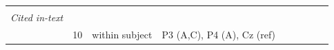 \documentclass[11pt,english,]{memoir}
\begin{document}
\begin{longtable}[]{@{}lllllllll@{}}
\begin{minipage}[t]{0.04\columnwidth}
\strut
\end{minipage} & \begin{minipage}[t]{0.04\columnwidth}\raggedright
\strut
\end{minipage} & \begin{minipage}[t]{0.10\columnwidth}\raggedright
\strut
\end{minipage} & \begin{minipage}[t]{0.28\columnwidth}\raggedright
\strut
\end{minipage}\tabularnewline
\begin{minipage}[t]{0.09\columnwidth}\raggedright
\emph{Cited in-text}\strut
\end{minipage} & \begin{minipage}[t]{0.02\columnwidth}\raggedright
\strut
\end{minipage} & \begin{minipage}[t]{0.04\columnwidth}\raggedright
\strut
\end{minipage} & \begin{minipage}[t]{0.10\columnwidth}\raggedright
\strut
\end{minipage} & \begin{minipage}[t]{0.04\columnwidth}\raggedright
\strut
\end{minipage} & \begin{minipage}[t]{0.04\columnwidth}\raggedright
\strut
\end{minipage} & \begin{minipage}[t]{0.04\columnwidth}\raggedright
\strut
\end{minipage} & \begin{minipage}[t]{0.10\columnwidth}\raggedright
\strut
\end{minipage} & \begin{minipage}[t]{0.28\columnwidth}\raggedright
\strut
\end{minipage}\tabularnewline
\begin{minipage}[t]{0.09\columnwidth}\raggedright
\textcite{Sparing2009}\strut
\end{minipage} & \begin{minipage}[t]{0.02\columnwidth}\raggedright
10\strut
\end{minipage} & \begin{minipage}[t]{0.04\columnwidth}\raggedright
within
subject\strut
\end{minipage} & \begin{minipage}[t]{0.10\columnwidth}\raggedright
P3 (A,C), P4 (A), Cz
(ref)\strut
\end{minipage} & \begin{minipage}[t]{0.04\columnwidth}\raggedright

\end{minipage}
\end{longtable}
\end{document}
